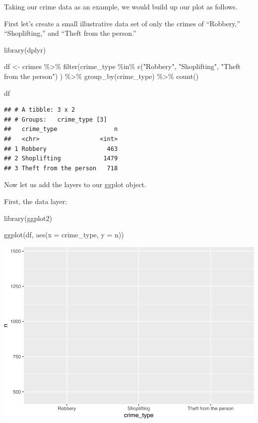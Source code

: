 \documentclass[
]{book}
\newenvironment{Shaded}{\begin{snugshade}}{\end{snugshade}}
\newcommand{\AttributeTok}[1]{\textcolor[rgb]{0.77,0.63,0.00}{#1}}
\newcommand{\FunctionTok}[1]{\textcolor[rgb]{0.00,0.00,0.00}{#1}}
\newcommand{\NormalTok}[1]{#1}
\newcommand{\OtherTok}[1]{\textcolor[rgb]{0.56,0.35,0.01}{#1}}
\newcommand{\SpecialCharTok}[1]{\textcolor[rgb]{0.00,0.00,0.00}{#1}}
\newcommand{\StringTok}[1]{\textcolor[rgb]{0.31,0.60,0.02}{#1}}
\begin{document}
Taking our crime data as an example, we would build up our plot as follows.

First let's create a small illustrative data set of only the crimes of ``Robbery,'' ``Shoplifting,'' and ``Theft from the person.''

\begin{Shaded}
\begin{Highlighting}[]
\FunctionTok{library}\NormalTok{(dplyr)}

\NormalTok{df }\OtherTok{\textless{}{-}}\NormalTok{ crimes }\SpecialCharTok{\%\textgreater{}\%} 
  \FunctionTok{filter}\NormalTok{(crime\_type }\SpecialCharTok{\%in\%} \FunctionTok{c}\NormalTok{(}\StringTok{"Robbery"}\NormalTok{, }
                           \StringTok{"Shoplifting"}\NormalTok{, }
                           \StringTok{"Theft from the person"}\NormalTok{)}
\NormalTok{         ) }\SpecialCharTok{\%\textgreater{}\%} 
  \FunctionTok{group\_by}\NormalTok{(crime\_type) }\SpecialCharTok{\%\textgreater{}\%} 
  \FunctionTok{count}\NormalTok{() }
  
\NormalTok{df}
\end{Highlighting}
\end{Shaded}

\begin{verbatim}
## # A tibble: 3 x 2
## # Groups:   crime_type [3]
##   crime_type                n
##   <chr>                 <int>
## 1 Robbery                 463
## 2 Shoplifting            1479
## 3 Theft from the person   718
\end{verbatim}

Now let us add the layers to our ggplot object.

First, the data layer:

\begin{Shaded}
\begin{Highlighting}[]
\FunctionTok{library}\NormalTok{(ggplot2)}

\FunctionTok{ggplot}\NormalTok{(df, }\FunctionTok{aes}\NormalTok{(}\AttributeTok{x =}\NormalTok{ crime\_type, }\AttributeTok{y =}\NormalTok{ n))}
\end{Highlighting}
\end{Shaded}

\includegraphics{crime_mapping_files/figure-latex/unnamed-chunk-8-1.pdf}
\end{document}
